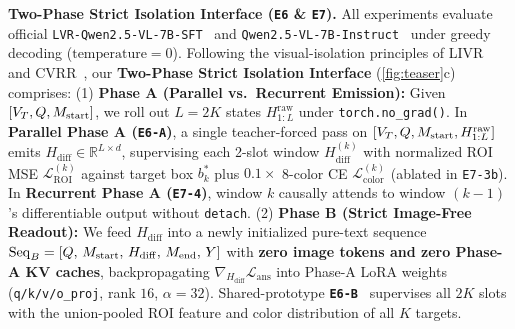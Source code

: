 \textbf{Two-Phase Strict Isolation Interface (\texttt{E6} \& \texttt{E7}).}
\label{subsec:method_e6}
All experiments evaluate official \texttt{LVR-Qwen2.5-VL-7B-SFT}~\cite{li2026lvr} and \texttt{Qwen2.5-VL-7B-Instruct}~\cite{bai2025qwen25vl} under greedy decoding ($\text{temperature}=0$). Following the visual-isolation principles of LIVR~\cite{li2026livr} and CVRR~\cite{park2026cvrr}, our \textbf{Two-Phase Strict Isolation Interface} (\cref{fig:teaser}c) comprises:
(1) \textbf{Phase A (Parallel vs.\ Recurrent Emission):} Given $[V_T, Q, M_{\mathrm{start}}]$, we roll out $L = 2K$ states $H_{1:L}^{\mathrm{raw}}$ under \texttt{torch.no\_grad()}. In \textbf{Parallel Phase A (\texttt{E6-A})}, a single teacher-forced pass on $[V_T, Q, M_{\mathrm{start}}, H_{1:L}^{\mathrm{raw}}]$ emits $H_{\mathrm{diff}} \in \mathbb{R}^{L \times d}$, supervising each 2-slot window $H_{\mathrm{diff}}^{(k)}$ with normalized ROI MSE $\mathcal{L}_{\mathrm{ROI}}^{(k)}$ against target box $b_k^*$ plus $0.1\times$ 8-color CE $\mathcal{L}_{\mathrm{color}}^{(k)}$ (ablated in \texttt{E7-3b}). In \textbf{Recurrent Phase A (\texttt{E7-4})}, window $k$ causally attends to window $(k{-}1)$'s differentiable output without \texttt{detach}.
(2) \textbf{Phase B (Strict Image-Free Readout):} We feed $H_{\mathrm{diff}}$ into a newly initialized pure-text sequence $\mathrm{Seq}_B = [Q,\, M_{\mathrm{start}},\, H_{\mathrm{diff}},\, M_{\mathrm{end}},\, Y]$ with \textbf{zero image tokens and zero Phase-A KV caches}, backpropagating $\nabla_{H_{\mathrm{diff}}} \mathcal{L}_{\mathrm{ans}}$ into Phase-A LoRA weights (\texttt{q/k/v/o\_proj}, rank $16$, $\alpha=32$). Shared-prototype \textbf{\texttt{E6-B}}~\cite{realvr2026} supervises all $2K$ slots with the union-pooled ROI feature and color distribution of all $K$ targets.
